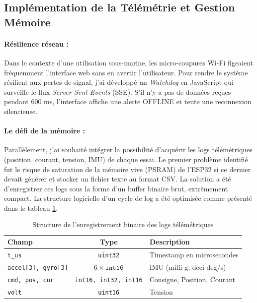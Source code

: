 \documentclass{tropLaClasse}
\begin{document}
\subsection{Implémentation de la Télémétrie et Gestion Mémoire}

\paragraph{Résilience réseau :}
Dans le contexte d'une utilisation sous-marine, les micro-coupures Wi-Fi figeaient fréquemment l'interface web sans en avertir l'utilisateur. Pour rendre le système résilient aux pertes de signal, j'ai développé un \textit{Watchdog} en JavaScript qui surveille le flux \textit{Server-Sent Events} (SSE). S'il n'y a pas de données reçues pendant 600 ms, l'interface affiche une alerte \og OFFLINE \fg{} et tente une reconnexion silencieuse.

\paragraph{Le défi de la mémoire :}
Parallèlement, j'ai souhaité intégrer la possibilité d'acquérir les logs télémétriques (position, courant, tension, IMU) de chaque essai. Le premier problème identifié fut le risque de saturation de la mémoire vive (PSRAM) de l'ESP32 si ce dernier devait générer et stocker un fichier texte au format CSV. La solution a été d'enregistrer ces logs sous la forme d'un buffer binaire brut, extrêmement compact. La structure logicielle d'un cycle de log a été optimisée comme présenté dans le tableau \ref{tab:telemetry}.

\begin{table}[h]
\centering
\begin{tabular}{|l|c|l|}
\hline
\textbf{Champ} & \textbf{Type} & \textbf{Description} \\ \hline
\texttt{t\_us} & \texttt{uint32} & Timestamp en microsecondes \\ \hline
\texttt{accel[3], gyro[3]} & $6 \times \texttt{int16}$ & IMU (milli-g, deci-deg/s) \\ \hline
\texttt{cmd, pos, cur} & \texttt{int16, int32, int16} & Consigne, Position, Courant \\ \hline
\texttt{volt} & \texttt{uint16} & Tension \\ \hline
\end{tabular}
\caption{Structure de l'enregistrement binaire des logs télémétriques}
\label{tab:telemetry}
\end{table}
\end{document}
